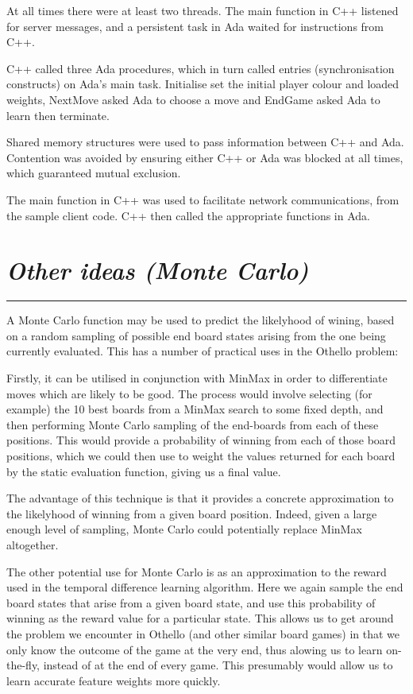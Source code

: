 \documentclass[10pt]{report}
\begin{document}
\begin{multicols}{2}
At all times there were at least two threads. The main function in C++ listened for server messages, and a persistent task in Ada waited for instructions from C++.

C++ called three Ada procedures, which in turn called entries (synchronisation constructs) on Ada's main task. Initialise set the initial player colour and loaded weights, NextMove asked Ada to choose a move and EndGame asked Ada to learn then terminate.

Shared memory structures were used to pass information between C++ and Ada. Contention was avoided by ensuring either C++ or Ada was blocked at all times, which guaranteed mutual exclusion.

The main function in C++ was used to facilitate network communications, from the sample client code. C++ then called the appropriate functions in Ada.

\section*{\emph{Other ideas (Monte Carlo)}}
\hrule
A Monte Carlo function may be used to predict the likelyhood of wining, based on a random sampling of possible end board states arising from the one being currently evaluated. This has a number of practical uses in the Othello problem:

Firstly, it can be utilised in conjunction with MinMax in order to differentiate moves which are likely to be good. The process would involve selecting (for example) the 10 best boards from a MinMax search to some fixed depth, and then performing Monte Carlo sampling of the end-boards from each of these positions. This would provide a probability of winning from each of those board positions, which we could then use to weight the values returned for each board by the static evaluation function, giving us a final value.

The advantage of this technique is that it provides a concrete approximation to the likelyhood of winning from a given board position. Indeed, given a large enough level of sampling, Monte Carlo could potentially replace MinMax altogether.

The other potential use for Monte Carlo is as an approximation to the reward used in the temporal difference learning algorithm. Here we again sample the end board states that arise from a given board state, and use this probability of winning as the reward value for a particular state. This allows us to get around the problem we encounter in Othello (and other similar board games) in that we only know the outcome of the game at the very end, thus alowing us to learn on-the-fly, instead of at the end of every game. This presumably would allow us to learn accurate feature weights more quickly.


\end{multicols}
\end{document}
